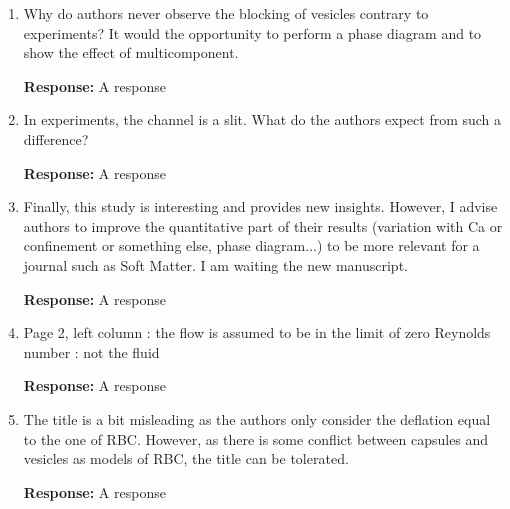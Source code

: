 \documentclass[11pt]{article}
\begin{document}
\begin{enumerate}
\item Why do authors never observe the blocking of vesicles contrary to
  experiments? It would the opportunity to perform a phase diagram and
    to show the effect of multicomponent.

\noindent
{\bf Response:} A response

\item In experiments, the channel is a slit. What do the authors expect
  from such a difference?

\noindent
{\bf Response:} A response

\item Finally, this study is interesting and provides new insights.
  However, I advise authors to improve the quantitative part of their
  results (variation with Ca or confinement or something else, phase
  diagram...) to be more relevant for a journal such as Soft Matter. I
  am waiting the new manuscript.

\noindent
{\bf Response:} A response

\item Page 2, left column : the flow is assumed to be in the limit of
  zero Reynolds number : not the fluid

\noindent
{\bf Response:} A response

\item The title is a bit misleading as the authors only consider the
  deflation equal to the one of RBC. However, as there is some conflict
  between capsules and vesicles as models of RBC, the title can be
  tolerated.

\noindent
{\bf Response:} A response
\end{enumerate}
\end{document}
